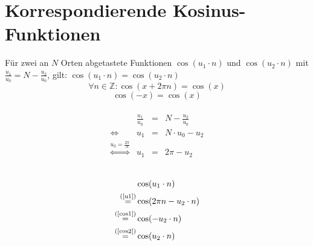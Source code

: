 \setcounter{section}{1}
\section{Korrespondierende Kosinus-Funktionen}
Für zwei an $N$ Orten abgetastete Funktionen $\cos(u_1\cdot n)$
und $\cos(u_2\cdot n)$ mit $ \frac{u_1}{u_0} = N - \frac{u_2}{u_0}$,
gilt: $\cos(u_1\cdot n)=\cos(u_2\cdot n)$ \\

\begin{equation}
	\label{cos1}
	\forall n \in \mathbb{Z}: \cos(x + 2\pi n) = \cos(x)
\end{equation}
\begin{equation}
	\label{cos2}
	\cos(-x ) = \cos(x)
\end{equation} \\
\begin{equation}
	\label{u1}
	\begin{alignedat}{3}
		& \frac{u_1}{u_0} & = & N - \frac{u_2}{u_0} \\
		\iff                                   & u_1             & = & N \cdot u_0 - u_2   \\
		\stackrel{u_0 = \frac{2 \pi}{N}}{\iff} & u_1             & = & 2\pi - u_2          \\
	\end{alignedat}
\end{equation} \\

\begin{equation}
	\begin{aligned}
		                                  & \cos(u_1\cdot n)            \\
		\stackrel{\text{(\ref{u1})}}{=}   & \cos(2\pi  n - u_2 \cdot n) \\
		\stackrel{\text{(\ref{cos1})}}{=} & \cos( - u_2 \cdot n)        \\
		\stackrel{\text{(\ref{cos2})}}{=} & \cos( u_2 \cdot n)          \\
	\end{aligned}
\end{equation}